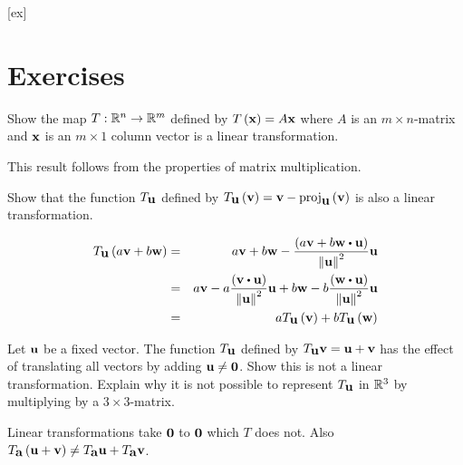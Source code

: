 [ex]
\section*{Exercises}

\begin{enumialphparenastyle}

\begin{ex} Show the map $T:\mathbb{R}^{n}\to \mathbb{R}^{m}$ defined by 
$T\left(\mbox{\bf x} \right) =A\mbox{\bf x}$ where $A$ is an $m\times n$-matrix
and $\mbox{\bf x}$ is an $m\times 1$ column vector is a linear transformation. 
\begin{sol}
This result follows from the properties of matrix multiplication.
\end{sol}
\end{ex}

\begin{ex} Show that the function $T_{\mbox{\bf u}}$ defined by $T_{\mbox{\bf u}}
\left(\mbox{\bf v}\right) = \mbox{\bf v}-\mbox{\rm proj}_{\mbox{\bf u}}\left(
\mbox{\bf v}\right) $ is also a linear transformation.
\begin{sol}
\begin{eqnarray*}
T_{\vect{u}}\tup{a\vect{v}+b\vect{w}} &=&a\vect{v}+b\vect{w}-\frac{\tup{a\vect{v}+b\vect{w}\dotprod \vect{u}} }{\norm{\vect{u}
} ^{2}}\vect{u} \\
&=&a\vect{v}-a\frac{\tup{\vect{v}\dotprod \vect{u}} }{\norm{\vect{u}} ^{2}}\vect{u}+b\vect{w}-b\frac{\tup{\vect{w}\dotprod \vect{u}
} }{\norm{\vect{u}} ^{2}}\vect{u} \\
&=&aT_{\vect{u}}\tup{\vect{v}} +bT_{\vect{u}}\tup{\vect{w}
}
\end{eqnarray*}
\end{sol}
\end{ex}

\begin{ex} Let $\mbox{\bf u}$ be a fixed vector. The function 
$T_{\mbox{\bf u}}$ defined by $T_{\mbox{\bf u}}\mbox{\bf v}=\mbox{\bf u}+\mbox{\bf v}$ has the effect of
translating all vectors by adding $\mbox{\bf u}\neq \mbox{\bf 0}$. Show this is not a
linear transformation. Explain why it is not possible to represent 
$T_{\mbox{\bf u}}$ in $\mathbb{R}^{3}$ by multiplying by a $3\times 3$-matrix.
\begin{sol}
Linear
transformations take $\mbox{\bf 0}$ to $\mbox{\bf 0}$ which $T$ does not. Also $T_{\mbox{\bf a}}\left(\mbox{\bf u}+\mbox{\bf v}\right) \neq T_{\mbox{\bf a}}\mbox{\bf u}+T_{\mbox{\bf a}}
\mbox{\bf v}$.
\end{sol}
\end{ex}

\end{enumialphparenastyle}